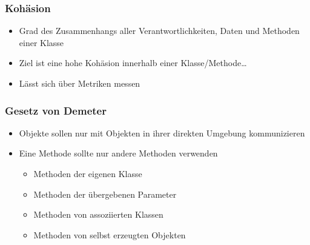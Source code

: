 \begin{frame}[fragile]
	\frametitle{Koh\"asion}
		\begin{itemize}
		  \item Grad des Zusammenhangs aller Verantwortlichkeiten, Daten und
		  Methoden einer Klasse
		  \item Ziel ist eine hohe Koh\"asion innerhalb einer Klasse/Methode\ldots
		  \item L\"asst sich \"uber Metriken messen
		\end{itemize}
\end{frame} 

\begin{frame}[fragile]
	\frametitle{Gesetz von Demeter}
		\begin{itemize}
		  \item Objekte sollen nur mit Objekten in ihrer direkten Umgebung
		  kommunizieren
		  \item Eine Methode sollte nur andere Methoden verwenden
		  	\begin{itemize}
		  	  \item Methoden der eigenen Klasse
		  	  \item Methoden der \"ubergebenen Parameter
		  	  \item Methoden von assoziierten Klassen
		  	  \item Methoden von selbst erzeugten Objekten
		  	\end{itemize}
		\end{itemize}
\end{frame}


